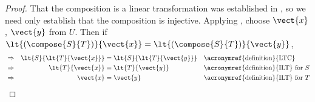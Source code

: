 %
\begin{proof}
That the composition is a linear transformation was established in , so we need only establish that the composition is injective.  Applying , choose $\vect{x}$, $\vect{y}$ from $U$.  Then if $\lt{\left(\compose{S}{T}\right)}{\vect{x}}=\lt{\left(\compose{S}{T}\right)}{\vect{y}}$,
%
\begin{align*}
%
&\Rightarrow&\lt{S}{\lt{T}{\vect{x}}}&=\lt{S}{\lt{T}{\vect{y}}}
&&\text{\acronymref{definition}{LTC}}\\
%
&\Rightarrow&\lt{T}{\vect{x}}&=\lt{T}{\vect{y}}
&&\text{\acronymref{definition}{ILT} for $S$}\\
%
&\Rightarrow&\vect{x}&=\vect{y}
&&\text{\acronymref{definition}{ILT} for $T$}
\end{align*}
%
\end{proof}
%
